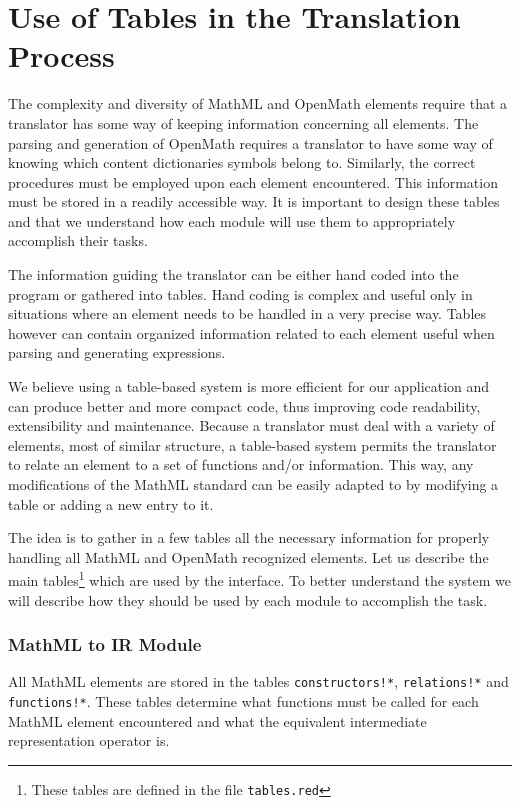 \section{Use of Tables in the Translation Process}

The complexity and diversity of MathML and OpenMath elements require that a translator has some way of keeping information concerning all elements.
The parsing and generation of OpenMath requires a translator to have some way of knowing which content dictionaries symbols belong to. Similarly,
the correct procedures must be employed upon each element encountered. This information must be stored in a readily accessible way. It is important
to design these tables and that we understand how each module will use them to appropriately accomplish their tasks.

The information guiding the translator can be either hand coded into the program or gathered into tables. Hand coding is complex and useful only in
situations where an element needs to be handled in a very precise way. Tables however can contain organized information related to each element
useful when parsing and generating expressions.

We believe using a table-based system is more efficient for our application and can produce better and more compact code, thus improving code
readability, extensibility and maintenance. Because a translator must deal with a variety of elements, most of similar structure, a table-based
system permits the translator to relate an element to a set of functions and/or information. This way, any modifications of the MathML standard can
be easily adapted to by modifying a table or adding a new entry to it.

The idea is to gather in a few tables all the necessary information for properly handling all MathML and OpenMath recognized elements. Let us
describe the main tables\footnote{These tables are defined in the file {\tt tables.red}} which are used by the interface. To better understand the
system we will describe how they should be used by each module to accomplish the task.

\subsubsection{MathML to IR Module}

All MathML elements are stored in the tables {\tt constructors!*}, {\tt relations!*} and {\tt functions!*}. These tables determine what functions
must be called for each MathML element encountered and what the equivalent intermediate representation operator is.

